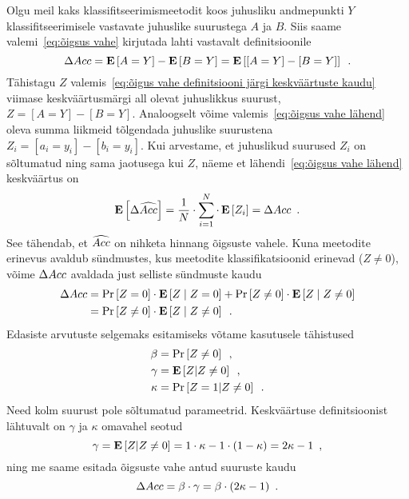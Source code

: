 Olgu meil kaks klassifitseerimismeetodit koos juhusliku andmepunkti $Y$ klassifitseerimisele vastavate juhuslike suurustega $A$ ja $B$. Siis saame valemi~\eqref{eq:õigsus vahe} kirjutada lahti vastavalt definitsioonile
\begin{equation}
    \label{eq:õigus vahe definitsiooni järgi keskväärtuste kaudu}
    \Delta Acc = \operatorname*{\mathbf{E}}\left[A = Y\right] - \operatorname*{\mathbf{E}}\left[B = Y\right] = \operatorname*{\mathbf{E}}\left[[A = Y] - [B = Y]\right] \enspace.
\end{equation}
Tähistagu $Z$ valemis~\eqref{eq:õigus vahe definitsiooni järgi keskväärtuste kaudu} viimase keskväärtusmärgi all olevat juhuslikkus suurust, $Z = [A = Y] - [B = Y]$. Analoogselt võime valemis~\eqref{eq:õigsus vahe lähend} oleva summa liikmeid tõlgendada juhuslike suurustena $Z_i = [a_i = y_i] - [b_i = y_i]$. Kui arvestame, et juhuslikud suurused $Z_i$ on sõltumatud ning sama jaotusega kui $Z$, näeme et lähendi~\eqref{eq:õigsus vahe lähend} keskväärtus on
\begin{equation}
    \operatorname*{\mathbf{E}}\left[\Delta \widehat{Acc}\right] = \frac{1}{N} \cdot \sum_{i = 1}^N \cdot \operatorname*{\mathbf{E}}\left[Z_i\right] = \Delta Acc \enspace.
\end{equation}
See tähendab, et $\widehat{Acc}$ on nihketa hinnang õigsuste vahele. Kuna meetodite erinevus avaldub sündmustes, kus meetodite klassifikatsioonid erinevad ($Z \neq 0$), võime $\Delta Acc$ avaldada just selliste sündmuste kaudu
\begin{align*}
    \Delta Acc &= \Pr\left[Z = 0\right] \cdot \operatorname*{\mathbf{E}}\left[Z \mid Z = 0\right] + \Pr\left[Z \neq 0\right] \cdot \operatorname*{\mathbf{E}}\left[Z \mid Z \neq 0\right] \\
    &= \Pr\left[Z \neq 0\right] \cdot \operatorname*{\mathbf{E}}\left[Z \mid Z \neq 0\right] \enspace.
\end{align*}
Edasiste arvutuste selgemaks esitamiseks võtame kasutusele tähistused
\begin{align}
    \beta &= \Pr\left[Z \neq 0\right] \enspace, \label{eq:beta} \\
    \gamma &= \operatorname*{\mathbf{E}}\left[Z | Z \neq 0\right] \enspace, \label{eq:gamma} \\
    \kappa &= \Pr\left[Z = 1 | Z \neq 0\right] \enspace. \label{eq:kappa}
\end{align}
Need kolm suurust pole sõltumatud parameetrid. Keskväärtuse definitsioonist lähtuvalt on $\gamma$ ja $\kappa$ omavahel seotud
\begin{equation*}
    \gamma = \operatorname*{\mathbf{E}}\left[Z | Z \neq 0\right] = 1 \cdot \kappa - 1 \cdot (1 - \kappa) = 2 \kappa - 1 \enspace,
\end{equation*}
ning me saame esitada õigsuste vahe antud suuruste kaudu
\begin{equation}
    \label{eq:õigsus vahe tähistega}
    \Delta Acc = \beta \cdot \gamma = \beta \cdot (2 \kappa - 1) \enspace.
\end{equation}

